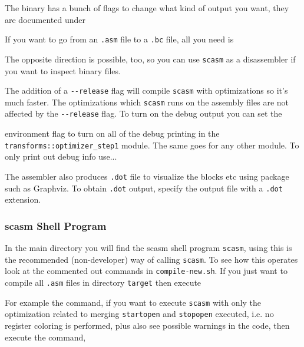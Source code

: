 
\noindent The binary has a bunch of flags to change what kind of output you want, they are documented under


\noindent If you want to go from an \verb+.asm+ file to a \verb+.bc+ file, all you need is


\noindent The opposite direction is possible, too, so you can use \verb+scasm+ as a disassembler if you want
to inspect binary files.

\noindent The addition of a \verb+--release+ flag will compile \verb+scasm+ with optimizations so it's much faster.
The optimizations which \verb+scasm+ runs on the assembly files are not affected by the \verb+--release+ flag.
To turn on the debug output you can set the


\noindent environment flag to turn on all of the debug printing in the
\verb+transforms::optimizer_step1+ module.  The same goes for any other module.
To only print out debug info use...


\noindent The assembler also produces \verb+.dot+ file to visualize the 
blocks etc using package such as Graphviz. 
To obtain \verb+.dot+ output, specify the output file with a \verb+.dot+ extension.

\subsubsection{scasm Shell Program}
In the main directory you will find the scasm shell program \verb+scasm+,
using this is the recommended (non-developer) way of calling \verb+scasm+.
To see how this operates look at the commented out commands in
\verb+compile-new.sh+.
If you just want to compile all \verb+.asm+ files in directory
\verb+target+ then execute


\noindent
For example the command, if you want to execute \verb+scasm+ with 
only the optimization related to merging \verb+startopen+ and 
\verb+stopopen+ executed, i.e. no register coloring is performed,
plus also see possible warnings in the code, then execute the command, 


